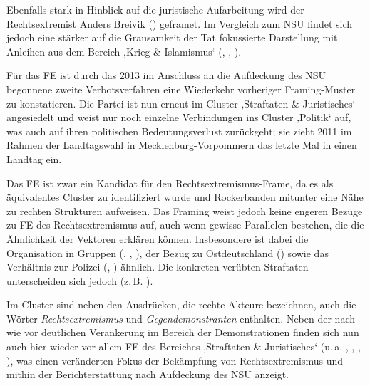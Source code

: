 Ebenfalls stark in Hinblick auf die juristische Aufarbeitung wird der Rechtsextremist Anders Breivik () geframet. Im Vergleich zum NSU findet sich jedoch eine stärker auf die Grausamkeit der Tat fokussierte Darstellung mit Anleihen aus dem Bereich ‚Krieg \& Islamismus` (, , ).

Für das FE  ist durch das 2013 im Anschluss an die Aufdeckung des NSU begonnene zweite Verbotsverfahren eine Wiederkehr vorheriger Framing-Muster zu konstatieren. Die Partei ist nun erneut im Cluster ‚Straftaten \& Juristisches` angesiedelt und weist nur noch einzelne Verbindungen ins Cluster ‚Politik` auf, was auch auf ihren politischen Bedeutungsverlust zurückgeht; sie zieht 2011 im Rahmen der Landtagswahl in Mecklenburg-Vorpommern das letzte Mal in einen Landtag ein.

Das FE  ist zwar ein Kandidat für den Rechtsextremismus-Frame, da es als äquivalentes Cluster zu  identifiziert wurde und Rockerbanden mitunter eine Nähe zu rechten Strukturen aufweisen. Das Framing weist jedoch keine engeren Bezüge zu FE des Rechtsextremismus auf, auch wenn gewisse Parallelen bestehen, die die Ähnlichkeit der Vektoren erklären können. Insbesondere ist dabei die Organisation in Gruppen (, , ), der Bezug zu Ostdeutschland () sowie das Verhältnis zur Polizei (, ) ähnlich. Die konkreten verübten Straftaten unterscheiden sich jedoch (z.\,B. ).

Im Cluster  sind neben den Ausdrücken, die rechte Akteure bezeichnen, auch die Wörter \emph{Rechtsextremismus} und \emph{Gegendemonstranten} enthalten. Neben der nach wie vor deutlichen Verankerung im Bereich der Demonstrationen finden sich nun auch hier wieder vor allem FE des Bereiches ‚Straftaten \& Juristisches` (u.\,a. , , , ), was einen veränderten Fokus der Bekämpfung von Rechtsextremismus und mithin der Berichterstattung nach Aufdeckung des NSU anzeigt.

